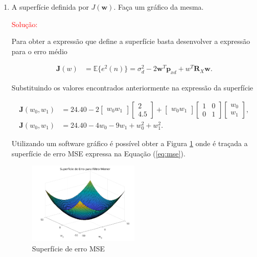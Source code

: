 \documentclass[a4paper,10pt]{article}
\begin{document}
\begin{enumerate}
\begin{enumerate}
					\item A superfície definida por $J(\mathbf{w})$. Faça um gráfico da mesma.
					
						\textcolor{red}{Solução:}
						
						Para obter a expressão que define a superfície basta desenvolver a expressão para o erro médio
						
						\begin{align}
							\mathbf{J}(w) &= \mathbb{E}\{e^{2}(n)\} = \sigma^{2}_{d} - 2\mathbf{w}^{T}\mathbf{p}_{xd} + w^{T}\mathbf{R}_{X}\mathbf{w}. \label{eq:mse}   
						\end{align}
						
						Substituindo os valores encontrados anteriormente na expressão da superfície
						
						\begin{align}
							\mathbf{J}(w_{0}, w_{1}) &= 24.40 - 2 \left[ \begin{matrix} w_{0}  w_{1} \end{matrix} \right] \left[ \begin{matrix} 2 \\ 4.5 \end{matrix} \right] + \left[ \begin{matrix} w_{0}  w_{1} \end{matrix} \right] \left[ \begin{matrix} 1 & 0 \\ 0 & 1 \end{matrix} \right]  \left[ \begin{matrix} w_{0}  \\ w_{1} \end{matrix} \right], \\
							\mathbf{J}(w_{0},w_{1}) &= 24.40 - 4w_{0} - 9w_{1} + w^{2}_{0} + w^{2}_{1}.
						\end{align}
						
						Utilizando um software gráfico é possível obter a Figura \ref{fig:01} onde é traçada a superfície de erro MSE expressa na Equação (\ref{eq:mse}).
					
						\begin{figure}[H]
							\centering
							\includegraphics[width=0.5\textwidth]{figs/superficie-de-erro.png}
							\caption{Superfície de erro MSE}
							\label{fig:01}
						\end{figure}
					
				\end{enumerate}
			
		\end{enumerate}
	
\end{document}
